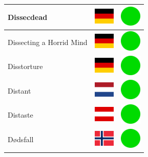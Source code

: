 \documentclass[12pt, a4paper, twoside]{report}
\begin{document}
\begin{center}
\begin{longtable}{|p{5cm}|p{2cm}|p{2cm}|}
 Dissecdead                                                 & \includegraphics[width=1cm]{../img/flags/de} &   \includegraphics[width=1cm]{../likes/y} \\ \hline
 Dissecting a Horrid Mind                                   & \includegraphics[width=1cm]{../img/flags/de} &   \includegraphics[width=1cm]{../likes/y} \\ \hline
 Disstorture                                                & \includegraphics[width=1cm]{../img/flags/de} &   \includegraphics[width=1cm]{../likes/y} \\ \hline
 Distant                                                    & \includegraphics[width=1cm]{../img/flags/nl} &   \includegraphics[width=1cm]{../likes/y} \\ \hline
 Distaste                                                   & \includegraphics[width=1cm]{../img/flags/at} &   \includegraphics[width=1cm]{../likes/y} \\ \hline
 Dødsfall                                                   & \includegraphics[width=1cm]{../img/flags/no} &   \includegraphics[width=1cm]{../likes/y} \\ \hline

\end{longtable}
\end{center}
\end{document}
